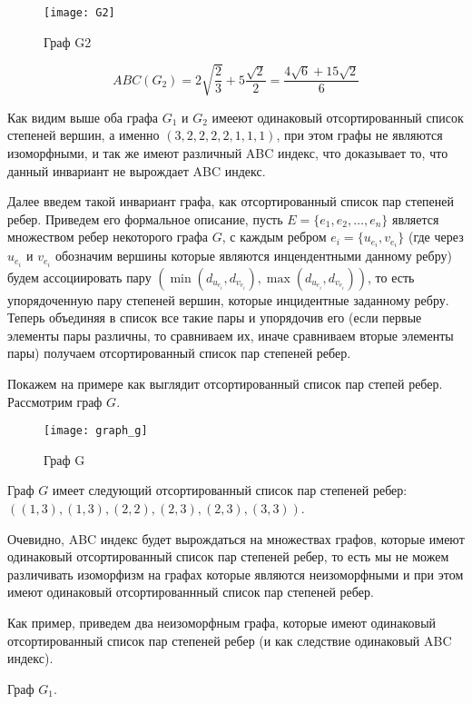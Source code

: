 \documentclass{article}
\begin{document}
\begin{figure}[h]
\texttt{[image: G2]}
\centering
\caption{Граф G2}
\end{figure}

$$ ABC(G_2) = 2\sqrt{\frac{2}{3}} + 5 \frac{\sqrt{2}}{2} = \frac{4 \sqrt{6} + 15 \sqrt{2}}{6} $$

Как видим выше оба графа $G_1$ и $G_2$ имееют одинаковый отсортированный список степеней вершин, а именно $(3, 2, 2, 2, 2, 1, 1, 1)$, при этом графы не являются изоморфными, и так же имеют различный ABC индекс, что доказывает то, что данный инвариант не вырождает ABC индекс.

\bigskip

Далее введем такой инвариант графа, как отсортированный список пар степеней ребер. Приведем его формальное описание, пусть $E = \{e_1, e_2, \dots, e_n \}$ является множеством ребер некоторого графа $G$, с каждым ребром $e_{i} = \{ u_{e_{i}}, v_{e_{i}} \}$ (где через $u_{e_{i}}$ и $v_{e_{i}}$ обозначим вершины которые являются инцендентными данному ребру) будем ассоциировать пару $(\min(d_{u_{e_{i}}}, d_{v_{e_{i}}}), \max(d_{u_{e_{i}}}, d_{v_{e_{i}}}))$, то есть упорядоченную пару степеней вершин, которые инцидентные заданному ребру. Теперь объединяя в список все такие пары и упорядочив его (если первые элементы пары различны, то сравниваем их, иначе сравниваем вторые элементы пары) получаем отсортированный список пар степеней ребер.

\newpage

Покажем на примере как выглядит отсортированный список пар степей ребер. Рассмотрим граф $G$.


\begin{figure}[h]
\texttt{[image: graph\_g]}
\centering
\caption{Граф G}
\end{figure}

Граф $G$ имеет следующий отсортированный список пар степеней ребер: $((1, 3), (1, 3), (2, 2), (2, 3), (2, 3), (3, 3))$.

Очевидно, ABC индекс будет вырождаться на множествах графов, которые имеют одинаковый отсортированный список пар степеней ребер, то есть мы не можем различивать изоморфизм на графах которые являются неизоморфными и при этом имеют одинаковый отсортированнный список пар степеней ребер. 

Как пример, приведем два неизоморфным графа, которые имеют одинаковый отсортированный список пар степеней ребер (и как следствие одинаковый ABC индекс).

Граф $G_1$.
\end{document}
